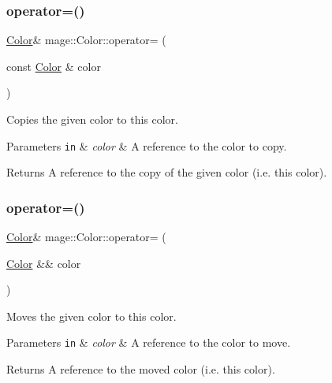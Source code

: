 \subsubsection{\texorpdfstring{operator=()}{operator=()}\hspace{0.1cm}{\footnotesize\ttfamily [1/2]}}
{\footnotesize\ttfamily \hyperlink{structmage_1_1_color}{Color}\& mage\+::\+Color\+::operator= (\begin{DoxyParamCaption}\item[{const \hyperlink{structmage_1_1_color}{Color} \&}]{color }\end{DoxyParamCaption})\hspace{0.3cm}{\ttfamily [default]}}

Copies the given color to this color.


\begin{DoxyParams}[1]{Parameters}
\mbox{\tt in}  & {\em color} & A reference to the color to copy. \\
\hline
\end{DoxyParams}
\begin{DoxyReturn}{Returns}
A reference to the copy of the given color (i.\+e. this color). 
\end{DoxyReturn}
\hypertarget{structmage_1_1_color_aa16160a9b8a03a8b2d82569343dd8c6d}{}\label{structmage_1_1_color_aa16160a9b8a03a8b2d82569343dd8c6d} 
\subsubsection{\texorpdfstring{operator=()}{operator=()}\hspace{0.1cm}{\footnotesize\ttfamily [2/2]}}
{\footnotesize\ttfamily \hyperlink{structmage_1_1_color}{Color}\& mage\+::\+Color\+::operator= (\begin{DoxyParamCaption}\item[{\hyperlink{structmage_1_1_color}{Color} \&\&}]{color }\end{DoxyParamCaption})\hspace{0.3cm}{\ttfamily [default]}}

Moves the given color to this color.


\begin{DoxyParams}[1]{Parameters}
\mbox{\tt in}  & {\em color} & A reference to the color to move. \\
\hline
\end{DoxyParams}
\begin{DoxyReturn}{Returns}
A reference to the moved color (i.\+e. this color). 
\end{DoxyReturn}
